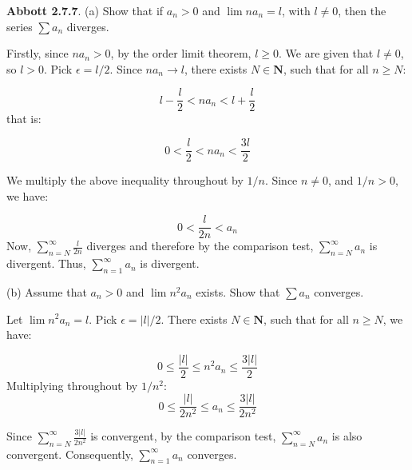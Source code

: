 \documentclass[10pt]{article}
\begin{document}
\textbf{Abbott 2.7.7}. (a) Show that if $\displaystyle a_{n}  >0$ and $\displaystyle \lim na_{n} =l$, with $\displaystyle l\neq 0$, then the series $\displaystyle \sum a_{n}$ diverges. 



Firstly, since $\displaystyle na_{n}  >0$, by the order limit theorem, $\displaystyle l\geq 0$. We are given that $\displaystyle l\neq 0$, so $\displaystyle l >0$. Pick $\displaystyle \epsilon =l/2$. Since $\displaystyle na_{n}\rightarrow l$, there exists $\displaystyle N\in \mathbf{N}$, such that for all $\displaystyle n\geq N$:


\begin{equation*}
l-\frac{l}{2} < na_{n} < l+\frac{l}{2}
\end{equation*}
that is:


\begin{equation*}
0< \frac{l}{2} < na_{n} < \frac{3l}{2}
\end{equation*}


We multiply the above inequality throughout by $\displaystyle 1/n$. Since $\displaystyle n\neq 0$, and $\displaystyle 1/n >0$, we have:


\begin{equation*}
0< \frac{l}{2n} < a_{n}
\end{equation*}
Now, $\displaystyle \sum _{n=N}^{\infty }\frac{l}{2n}$ diverges and therefore by the comparison test, $\displaystyle \sum _{n=N}^{\infty } a_{n}$ is divergent. Thus, $\displaystyle \sum _{n=1}^{\infty } a_{n}$ is divergent.

(b) Assume that $\displaystyle a_{n}  >0$ and $\displaystyle \lim n^{2} a_{n}$ exists. Show that $\displaystyle \sum a_{n}$ converges.



Let $\displaystyle \lim n^{2} a_{n} =l$. Pick $\displaystyle \epsilon =|l|/2$. There exists $\displaystyle N\in \mathbf{N}$, such that for all $\displaystyle n\geq N$, we have:


\begin{equation*}
0\leq \frac{|l|}{2} \leq n^{2} a_{n} \leq \frac{3|l|}{2}
\end{equation*}
Multiplying throughout by $\displaystyle 1/n^{2}$:
\begin{equation*}
0\leq \frac{|l|}{2n^{2}} \leq a_{n} \leq \frac{3|l|}{2n^{2}}
\end{equation*}


Since $\displaystyle \sum _{n=N}^{\infty }\frac{3|l|}{2n^{2}}$ is convergent, by the comparison test, $\displaystyle \sum _{n=N}^{\infty } a_{n}$ is also convergent. Consequently, $\displaystyle \sum _{n=1}^{\infty } a_{n}$ converges.
\end{document}
